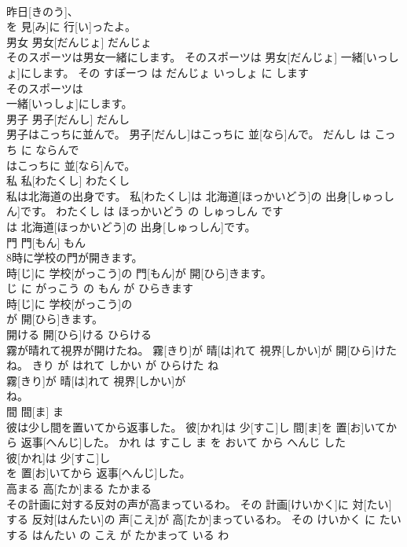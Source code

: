 \documentclass[8pt]{extreport}
\begin{document}
\begin{CJK}{UTF8}{min}
\\	昨日[きのう]、
\\	を 見[み]に 行[い]ったよ。			
\\	男女	男女[だんじょ]	だんじょ	
\\	そのスポーツは男女一緒にします。	そのスポーツは 男女[だんじょ] 一緒[いっしょ]にします。	その すぽーつ は だんじょ いっしょ に します	
\\	そのスポーツは
\\	一緒[いっしょ]にします。			
\\	男子	男子[だんし]	だんし	
\\	男子はこっちに並んで。	男子[だんし]はこっちに 並[なら]んで。	だんし は こっち に ならんで	
\\	はこっちに 並[なら]んで。			
\\	私	私[わたくし]	わたくし	
\\	私は北海道の出身です。	私[わたくし]は 北海道[ほっかいどう]の 出身[しゅっしん]です。	わたくし は ほっかいどう の しゅっしん です	
\\	は 北海道[ほっかいどう]の 出身[しゅっしん]です。			
\\	門	門[もん]	もん	
\\	8時に学校の門が開きます。	
\\	時[じ]に 学校[がっこう]の 門[もん]が 開[ひら]きます。	
\\	じ に がっこう の もん が ひらきます	
\\	時[じ]に 学校[がっこう]の
\\	が 開[ひら]きます。			
\\	開ける	開[ひら]ける	ひらける	
\\	霧が晴れて視界が開けたね。	霧[きり]が 晴[は]れて 視界[しかい]が 開[ひら]けたね。	きり が はれて しかい が ひらけた ね	
\\	霧[きり]が 晴[は]れて 視界[しかい]が
\\	ね。			
\\	間	間[ま]	ま	
\\	彼は少し間を置いてから返事した。	彼[かれ]は 少[すこ]し 間[ま]を 置[お]いてから 返事[へんじ]した。	かれ は すこし ま を おいて から へんじ した	
\\	彼[かれ]は 少[すこ]し
\\	を 置[お]いてから 返事[へんじ]した。			
\\	高まる	高[たか]まる	たかまる	
\\	その計画に対する反対の声が高まっているわ。	その 計画[けいかく]に 対[たい]する 反対[はんたい]の 声[こえ]が 高[たか]まっているわ。	その けいかく に たいする はんたい の こえ が たかまって いる わ	

\end{CJK}
\end{document}
